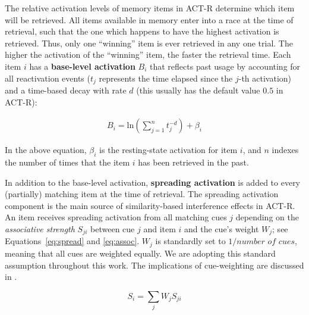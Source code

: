 \documentclass{cambridge7A}\usepackage[]{graphicx}\usepackage[]{color}
\newcommand{\revFE}[1]{#1}
\begin{document}
The relative activation levels of memory items in ACT-R determine which item will be retrieved. All items available in memory enter into a race at the time of retrieval, such that the one which happens to have the highest activation is retrieved. Thus, only one ``winning'' item is ever retrieved in any one trial. The higher the activation of the ``winning'' item, the faster the retrieval time.  Each item $i$ has a \textbf{base-level activation} $B_i$  that reflects past usage by accounting for all reactivation events ($t_j$ represents the time elapsed since the $j$-th activation) and a time-based decay with rate $d$ (this usually has the default value $0.5$ in ACT-R):

\begin{eqnarray}
  B_i = \text{ln}(\sum_{j=1}^n t_j^{-d}) + \beta_i \label{eq:bl}
\end{eqnarray}

\noindent
In the above equation, $\beta_i$ is the resting-state activation for item $i$, and $n$ indexes the number of times that the item $i$ has been retrieved in the past.

In addition to the base-level activation, \textbf{spreading activation} is added to every (partially) matching item at the time of retrieval. The spreading activation component is the main source of similarity-based interference effects in ACT-R. 
An item receives spreading activation from all matching cues $j$ depending on the \emph{associative strength} $S_{ji}$ between cue $j$ and item $i$ and the cue's weight $W_{j}$; see Equations~\ref{eq:spread} and \ref{eq:assoc}. $W_j$ is standardly set to \revFE{$1/\textit{number of cues}$}, meaning that all cues are weighted equally. We are adopting this standard assumption throughout this work.  The implications of cue-weighting are discussed in \citep{VasishthEtAlTiCS2019,JaegerMertzenVanDykeVasishth2019}. 

\begin{equation}
      S_i = \sum_j W_{j} S_{ji} \label{eq:spread}
\end{equation}
\end{document}
